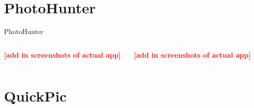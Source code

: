 \documentclass[aspectratio=169]{beamer}
\newcommand{\todo}[1]{\textcolor{red}{\textbf{[#1]}}}
\begin{document}
\section{PhotoHunter}

\begin{frame}{PhotoHunter}
  \begin{columns}[c]
    \begin{column}{0.5\columnwidth}
      \centering
			\todo{add in screenshots of actual app}
    \end{column}
    \begin{column}{0.5\columnwidth}
      \centering
			\todo{add in screenshots of actual app}
    \end{column}
  \end{columns}
\end{frame}

\section{QuickPic}
\end{document}
